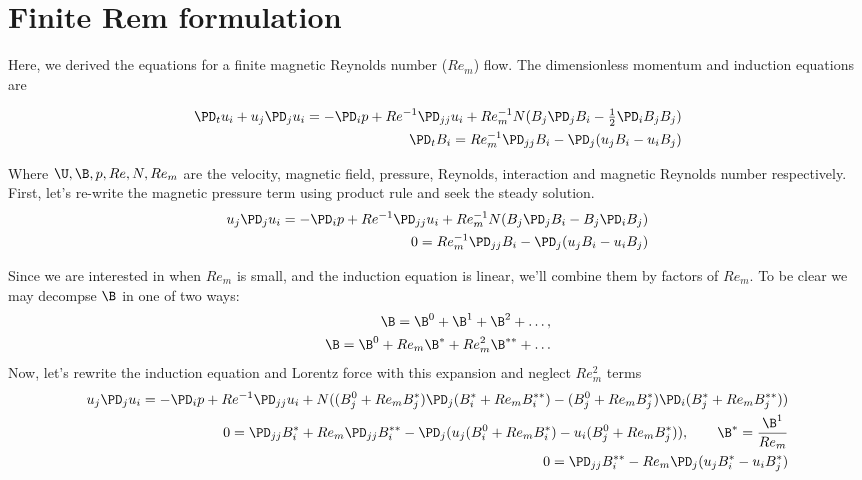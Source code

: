 \documentclass[11pt]{article}
\begin{document}
\doublespacing
\MOONSTITLE
\maketitle

\section{Finite Rem formulation}
Here, we derived the equations for a finite magnetic Reynolds number ($Re_m$) flow. The dimensionless momentum and induction equations are

\begin{equation}\begin{aligned}
\PD_t u_i+u_j\PD_j u_i =-\PD_i p+ Re^{-1} \PD_{jj} u_i + Re_m^{-1} N (B_j \PD_j B_i - \tfrac{1}{2} \PD_i B_j B_j) \\
\PD_t B_i = Re_m^{-1} \PD_{jj} B_i - \PD_j (u_j B_i - u_i B_j)
\end{aligned} \end{equation}

Where $\U,\B,p,Re,N,Re_m$ are the velocity, magnetic field, pressure, Reynolds, interaction and magnetic Reynolds number respectively. First, let's re-write the magnetic pressure term using product rule and seek the steady solution.
\begin{equation}\begin{aligned}
u_j\PD_j u_i =-\PD_i p+ Re^{-1} \PD_{jj} u_i + Re_m^{-1} N (B_j \PD_j B_i - B_j \PD_i B_j) \\
0 = Re_m^{-1} \PD_{jj} B_i - \PD_j (u_j B_i - u_i B_j)
\end{aligned} \end{equation}

Since we are interested in when $Re_m$ is small, and the induction equation is linear, we'll combine them by factors of $Re_m$. To be clear we may decompse $\B$ in one of two ways:
\begin{equation}\begin{aligned}
	\B = \B^0 + \B^1 + \B^2 + \hdots , \\
	\B = \B^0 + Re_m \B^* + Re_m^2 \B^{**} + \hdots \\
\end{aligned} \end{equation}
Now, let's rewrite the induction equation and Lorentz force with this expansion and neglect $Re_m^2$ terms
\begin{equation}\begin{aligned}
u_j\PD_j u_i =-\PD_i p+ Re^{-1} \PD_{jj} u_i + N ((B_j^0+Re_m B_j^*) \PD_j (B_i^* + Re_m B_i^{**}) - (B_j^0+Re_m B_j^*) \PD_i (B_j^*+Re_m B_j^{**})) \\
0 = \PD_{jj} B_i^* + Re_m \PD_{jj} B_i^{**} - \PD_j (u_j (B_i^0 + Re_m B_i^{*}) - u_i (B_j^0+Re_m B_j^{*})), \qquad \B^* = \frac{\B^1}{Re_m} \\
0 = \PD_{jj} B_i^{**} - Re_m \PD_j (u_j B_i^* - u_i B_j^*)
\end{aligned} \end{equation}
\end{document}
